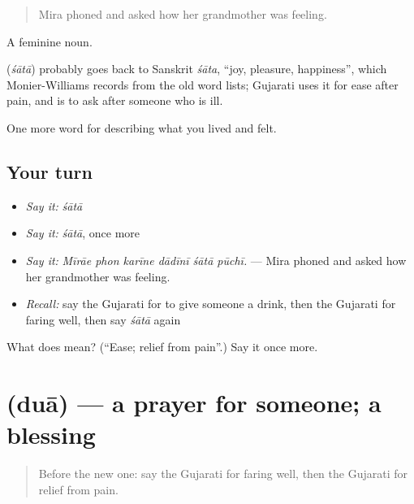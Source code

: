 \begin{quote}
Mira phoned and asked how her grandmother was feeling.
\end{quote}

A feminine noun.

\begin{cousinweb}
\textbf{} (\emph{śātā}) probably goes back to Sanskrit \emph{śāta}, \textquotedblleft{}joy, pleasure, happiness\textquotedblright{}, which Monier-Williams records from the old word lists; Gujarati uses it for ease after pain, and \textbf{ } is to ask after someone who is ill.
\end{cousinweb}

\begin{grammarlens}[title={What you've built}]
One more word for describing what you lived and felt.
\end{grammarlens}

\subsection*{Your turn}
\begin{itemize}
\raggedright
  \item \emph{Say it:} \emph{śātā}
  \item \emph{Say it:} \emph{śātā}, once more
  \item \emph{Say it:} \emph{Mīrāe phon karīne dādīnī śātā pūchī.} — Mira phoned and asked how her grandmother was feeling.
  \item \emph{Recall:} say the Gujarati for to give someone a drink, then the Gujarati for faring well, then say \emph{śātā} again
\end{itemize}

\begin{tcolorbox}[breakable,colback=teal!4,colframe=teal!35!black,title={Before you move on}]
What does  mean? (\textquotedblleft{}Ease; relief from pain\textquotedblright{}.) Say it once more.
\end{tcolorbox}
\section[\texorpdfstring{\gu{દુઆ} (duā)}{દુઆ (duā)}]{ (duā) — a prayer for someone; a blessing}

\label{lesson:GU-C489-dua}



\begin{quote}
Before the new one: say the Gujarati for faring well, then the Gujarati for relief from pain.
\end{quote}

